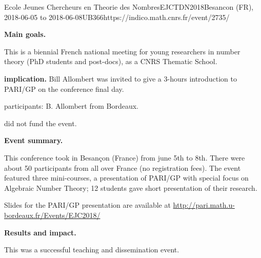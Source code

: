 \begin{event}{Ecole Jeunes Chercheurs en Theorie des
  Nombres}{EJCTDN2018}{Besancon (FR),
  2018-06-05 to 2018-06-08}{UB}{36}{6}{https://indico.math.cnrs.fr/event/2735/}

\textbf{Main goals.}

This is a biennial French national meeting for young researchers in number
  theory (PhD students and post-docs), as a CNRS Thematic School.

\textbf{\ODK implication.}
Bill Allombert was invited to give a 3-hours introduction to PARI/GP on
the conference final day.

\ODK participants: B. Allombert from Bordeaux.

\ODK did not fund the event.

\textbf{Event summary.}

  This conference took in Besan\c{c}on (France) from june 5th to
8th. There were about 50 participants
  from all over France (no registration fees). The event featured three
  mini-courses, a presentation of PARI/GP with special focus on Algebraic
  Number Theory; 12 students gave short presentation of their research.

Slides for the PARI/GP presentation are available at
\url{http://pari.math.u-bordeaux.fr/Events/EJC2018/}

\textbf{Results and impact.}

This was a successful teaching and dissemination event.
\end{event}
